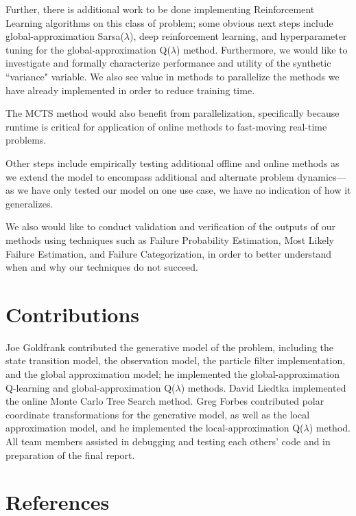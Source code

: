\documentclass{article}
\begin{document}
\par Further, there is additional work to be done implementing Reinforcement Learning algorithms on this class of problem; some obvious next steps include global-approximation Sarsa($\lambda$), deep reinforcement learning, and hyperparameter tuning for the global-approximation Q($\lambda$) method. Furthermore, we would like to investigate and formally characterize performance and utility of the synthetic ``variance" variable. We also see value in methods to parallelize the methods we have already implemented in order to reduce training time.

\par The MCTS method would also benefit from parallelization, specifically because runtime is critical for application of online methods to fast-moving real-time problems.

\par Other steps include empirically testing additional offline and online methods as we extend the model to encompass additional and alternate problem dynamics--- as we have only tested our model on one use case, we have no indication of how it generalizes.

\par We also would like to conduct validation and verification of the outputs of our methods using techniques such as Failure Probability Estimation, Most Likely Failure Estimation, and Failure Categorization, in order to better understand when and why our techniques do not succeed.

\clearpage

\section*{Contributions}
Joe Goldfrank contributed the generative model of the problem, including the state transition model, the observation model, the particle filter implementation, and the global approximation model; he implemented the global-approximation Q-learning and global-approximation Q($\lambda$) methods. David Liedtka implemented the online Monte Carlo Tree Search method. Greg Forbes contributed polar coordinate transformations for the generative model, as well as the local approximation model, and he implemented the local-approximation Q($\lambda$) method. All team members assisted in debugging and testing each others' code and in preparation of the final report.


\section*{References}
\end{document}
